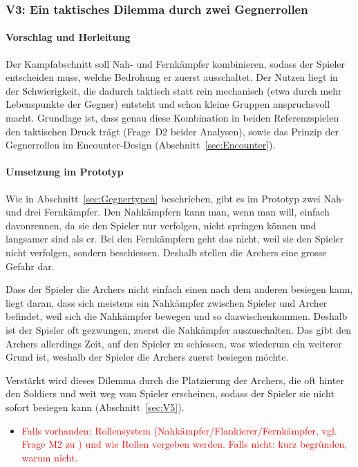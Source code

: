 \documentclass[../Main.tex]{subfiles}
\begin{document}
\subsubsection{V3: Ein taktisches Dilemma durch zwei Gegnerrollen} \label{sec:V3}

\paragraph{Vorschlag und Herleitung}
Der Kampfabschnitt soll Nah- und Fernkämpfer kombinieren, sodass der Spieler entscheiden muss, welche Bedrohung er zuerst ausschaltet. Der Nutzen liegt in der Schwierigkeit, die dadurch taktisch statt rein mechanisch (etwa durch mehr Lebenspunkte der Gegner) entsteht und schon kleine Gruppen anspruchsvoll macht. Grundlage ist, dass genau diese Kombination in beiden Referenzspielen den taktischen Druck trägt (Frage~D2 beider Analysen), sowie das Prinzip der Gegnerrollen im Encounter-Design (Abschnitt~\ref{sec:Encounter}).

\paragraph{Umsetzung im Prototyp}
Wie in Abschnitt~\ref{sec:Gegnertypen} beschrieben, gibt es im Prototyp zwei Nah- und drei Fernkämpfer. Den Nahkämpfern kann man, wenn man will, einfach davonrennen, da sie den Spieler nur verfolgen, nicht springen können und langsamer sind als er. Bei den Fernkämpfern geht das nicht, weil sie den Spieler nicht verfolgen, sondern beschiessen. Deshalb stellen die Archers eine grosse Gefahr dar.

Dass der Spieler die Archers nicht einfach einen nach dem anderen besiegen kann, liegt daran, dass sich meistens ein Nahkämpfer zwischen Spieler und Archer befindet, weil sich die Nahkämpfer bewegen und so dazwischenkommen. Deshalb ist der Spieler oft gezwungen, zuerst die Nahkämpfer auszuschalten. Das gibt den Archers allerdings Zeit, auf den Spieler zu schiessen, was wiederum ein weiterer Grund ist, weshalb der Spieler die Archers zuerst besiegen möchte.

Verstärkt wird dieses Dilemma durch die Platzierung der Archers, die oft hinter den Soldiers und weit weg vom Spieler erscheinen, sodass der Spieler sie nicht sofort besiegen kann (Abschnitt~\ref{sec:V5}).

\begin{itemize}[leftmargin=1.5cm]
    \item \textcolor{red}{Falls vorhanden: Rollensystem (Nahkämpfer/Flankierer/Fernkämpfer, vgl. Frage M2 zu ) und wie Rollen vergeben werden. Falls nicht: kurz begründen, warum nicht.}
\end{itemize}
\end{document}
